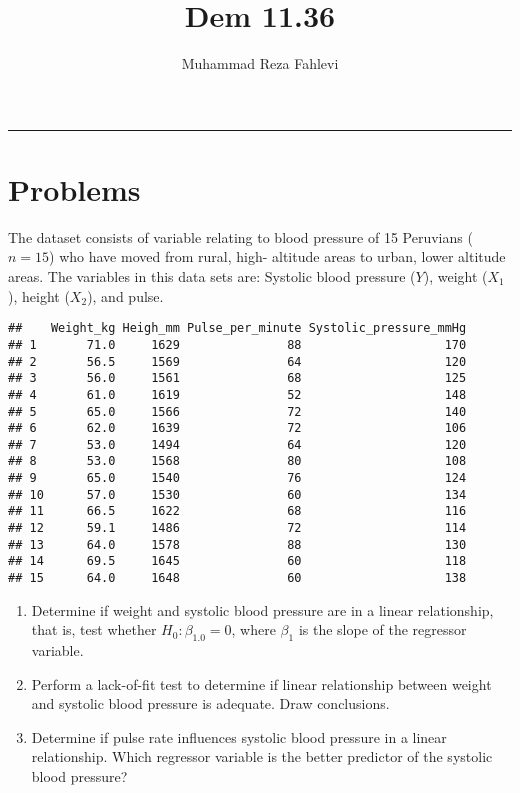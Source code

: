 \documentclass[
]{article}
\title{Dem 11.36}
\author{Muhammad Reza Fahlevi}
\date{}
\providecommand{\tightlist}{%
  \setlength{\itemsep}{0pt}\setlength{\parskip}{0pt}}
\begin{document}
\maketitle

{
\setcounter{tocdepth}{2}
\tableofcontents
}
\begin{center}\rule{0.5\linewidth}{0.5pt}\end{center}

\hypertarget{problems}{%
\section{Problems}\label{problems}}

The dataset consists of variable relating to blood pressure of 15
Peruvians (\(n = 15\)) who have moved from rural, high- altitude areas
to urban, lower altitude areas. The variables in this data sets are:
Systolic blood pressure (\(Y\)), weight (\(X_1\)), height (\(X_2\)), and
pulse.

\begin{verbatim}
##    Weight_kg Heigh_mm Pulse_per_minute Systolic_pressure_mmHg
## 1       71.0     1629               88                    170
## 2       56.5     1569               64                    120
## 3       56.0     1561               68                    125
## 4       61.0     1619               52                    148
## 5       65.0     1566               72                    140
## 6       62.0     1639               72                    106
## 7       53.0     1494               64                    120
## 8       53.0     1568               80                    108
## 9       65.0     1540               76                    124
## 10      57.0     1530               60                    134
## 11      66.5     1622               68                    116
## 12      59.1     1486               72                    114
## 13      64.0     1578               88                    130
## 14      69.5     1645               60                    118
## 15      64.0     1648               60                    138
\end{verbatim}

\begin{enumerate}
\def\labelenumi{\roman{enumi}.}
\tightlist
\item
  Determine if weight and systolic blood pressure are in a linear
  relationship, that is, test whether \(H_0 : \beta_{1.0} = 0\), where
  \(\beta_1\) is the slope of the regressor variable.
\item
  Perform a lack-of-ﬁt test to determine if linear relationship between
  weight and systolic blood pressure is adequate. Draw conclusions.
\item
  Determine if pulse rate inﬂuences systolic blood pressure in a linear
  relationship. Which regressor variable is the better predictor of the
  systolic blood pressure?
\end{enumerate}
\end{document}
